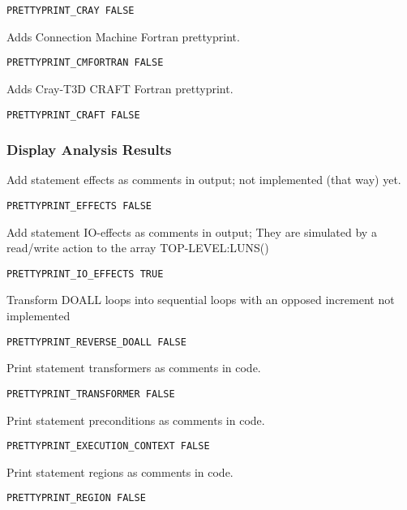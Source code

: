 \begin{verbatim}
PRETTYPRINT_CRAY FALSE
\end{verbatim}

Adds Connection Machine Fortran prettyprint.

\begin{verbatim}
PRETTYPRINT_CMFORTRAN FALSE
\end{verbatim}

Adds Cray-T3D CRAFT Fortran prettyprint.

\begin{verbatim}
PRETTYPRINT_CRAFT FALSE
\end{verbatim}

\subsubsection{Display Analysis Results}

Add statement effects as comments in output; not implemented (that way) yet.

\begin{verbatim}
PRETTYPRINT_EFFECTS FALSE
\end{verbatim}

Add statement IO-effects as comments in output; They are simulated by
a read/write action to the array TOP-LEVEL:LUNS()

\begin{verbatim}
PRETTYPRINT_IO_EFFECTS TRUE
\end{verbatim}

Transform DOALL loops into sequential loops with an opposed increment
not implemented

\begin{verbatim}
PRETTYPRINT_REVERSE_DOALL FALSE
\end{verbatim}

Print statement transformers as comments in code.

\begin{verbatim}
PRETTYPRINT_TRANSFORMER FALSE
\end{verbatim}

Print statement preconditions as comments in code.

\begin{verbatim}
PRETTYPRINT_EXECUTION_CONTEXT FALSE
\end{verbatim}

Print statement regions as comments in code.

\begin{verbatim}
PRETTYPRINT_REGION FALSE
\end{verbatim}


